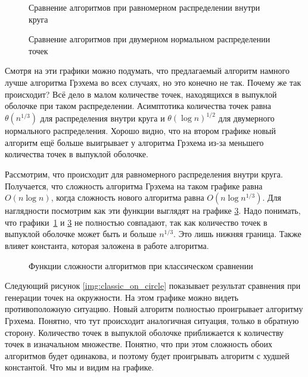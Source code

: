 \begin{figure}[hbt]
	\centering
	
	\caption{Сравнение алгоритмов при равномерном распределении внутри круга}
	\label{img:classic_in_circle}
\end{figure}

\begin{figure}[H]
	\centering
	
	\caption{Сравнение алгоритмов при двумерном нормальном распределении точек}
	\label{img:classic_gauss}
\end{figure}

Смотря на эти графики можно подумать, что предлагаемый алгоритм намного лучше алгоритма Грэхема во всех случаях, но это конечно не так. Почему же так происходит? Всё дело в малом количестве точек, находящихся в выпуклой оболочке при таком распределении. Асимптотика количества точек равна $\theta( n^{1/3} )$ для распределения внутри круга и $\theta{(\log n)^{1/2}}$ для двумерного нормального распределения\cite{algolist2010convexhull}. Хорошо видно, что на втором графике новый алгоритм ещё больше выигрывает у алгоритма Грэхема из-за меньшего количества точек в выпуклой оболочке.

Рассмотрим, что происходит для равномерного распределения внутри круга. Получается, что сложность алгоритма Грэхема на таком графике равна $O(n \log{n})$, когда сложность нового алгоритма равна $O(n \log{n^{1/3}})$. Для наглядности посмотрим как эти функции выглядят на графике \ref{img:charts_comparison}. Надо понимать, что графики~\ref{img:classic_in_circle} и \ref{img:charts_comparison} не полностью совпадают, так как количество точек в выпуклой оболочке может быть и больше $n^{1/3}$. Это лишь нижняя граница. Также влияет константа, которая заложена в работе алгоритма.

\begin{figure}[hbt]
	\centering
	
	\caption{Функции сложности алгоритмов при классическом сравнении}
	\label{img:charts_comparison}
\end{figure}

Следующий рисунок \ref{img:classic_on_circle} показывает результат сравнения при генерации точек на окружности. На этом графике можно видеть противоположную ситуацию. Новый алгоритм полностью проигрывает алгоритму Грэхема. Понятно, что тут происходит аналогичная ситуация, только в обратную сторону. Количество точек в выпуклой оболочке приближается к количеству точек в изначальном множестве. Понятно, что при этом сложность обоих алгоритмов будет одинакова, и поэтому будет проигрывать алгоритм с худшей константой. Что мы и видим на графике.

